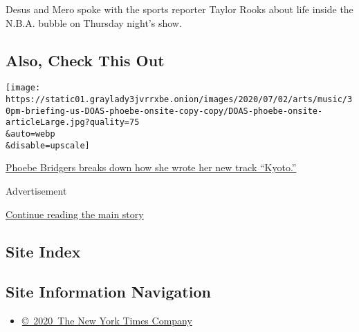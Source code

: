 Desus and Mero spoke with the sports reporter Taylor Rooks about life
inside the N.B.A. bubble on Thursday night's show.

\hypertarget{also-check-this-out}{%
\subsection{Also, Check This Out}\label{also-check-this-out}}

\texttt{[image: https://static01.graylady3jvrrxbe.onion/images/2020/07/02/arts/music/30pm-briefing-us-DOAS-phoebe-onsite-copy-copy/DOAS-phoebe-onsite-articleLarge.jpg?quality=75\\\&auto=webp\\\&disable=upscale]}

\href{https://www.nytimes3xbfgragh.onion/2020/07/30/arts/music/phoebe-bridgers-kyoto.html}{Phoebe
Bridgers breaks down how she wrote her new track ``Kyoto.''}

Advertisement

\protect\hyperlink{after-bottom}{Continue reading the main story}

\hypertarget{site-index}{%
\subsection{Site Index}\label{site-index}}

\hypertarget{site-information-navigation}{%
\subsection{Site Information
Navigation}\label{site-information-navigation}}

\begin{itemize}
\tightlist
\item
  \href{https://help.nytimes3xbfgragh.onion/hc/en-us/articles/115014792127-Copyright-notice}{©~2020~The
  New York Times Company}
\end{itemize}

